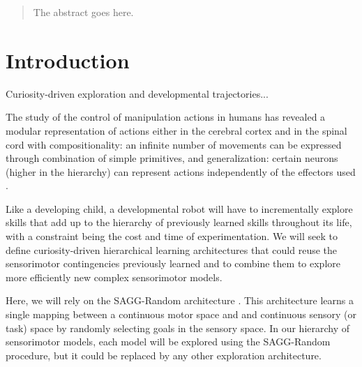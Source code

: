\documentclass[conference]{include/IEEEtran}
\begin{document}
\begin{abstract}
The abstract goes here.
\end{abstract}





%
\IEEEpeerreviewmaketitle



\section{Introduction}

	Curiosity-driven exploration and developmental trajectories...
	
	
	
	The study of the control of manipulation actions in humans has revealed a modular representation of actions 
	either in the cerebral cortex and in the spinal 
	cord with compositionality: an infinite number of movements can be expressed through combination of simple primitives, 
	and generalization: certain neurons (higher 
	in the hierarchy) can represent actions independently of the effectors used \cite{cangelosi2010integration}.
	
	Like a developing child, a developmental robot will have to incrementally explore skills that add up to the hierarchy of previously learned skills 
	throughout its life, with a constraint being the cost and time of experimentation. 
	We will seek to define curiosity-driven hierarchical learning architectures 
	that could reuse the sensorimotor contingencies previously learned and to combine them 
	to explore more efficiently new complex sensorimotor models. 
		
	Here, we will rely on the SAGG-Random architecture \cite{baranes2010intrinsically}.
	This architecture learns a single mapping between a continuous motor space and and continuous sensory (or task) 
	space by randomly selecting goals in the sensory space. 
	In our hierarchy of sensorimotor models, each model will be explored using the SAGG-Random procedure, but it could be replaced by any other exploration architecture.
	
\end{document}

